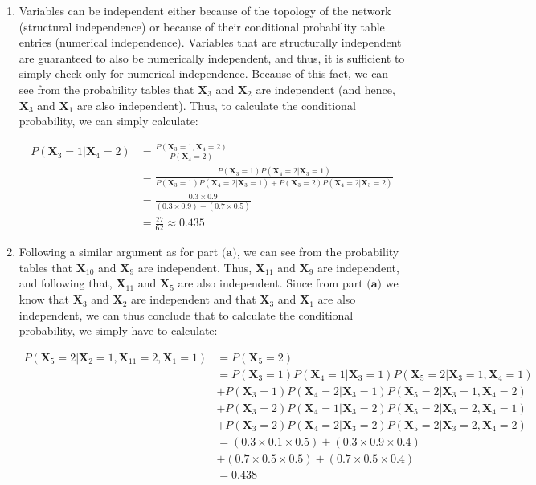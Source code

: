 \documentclass[11pt,fancychapters]{article}
\begin{document}
\begin{enumerate}[label=\textbf{(\alph*)}]
	\item Variables can be independent either because of the topology of the network (structural independence) or because of their conditional probability table entries (numerical independence). Variables that are structurally independent are guaranteed to also be numerically independent, and thus, it is sufficient to simply check only for numerical independence. Because of this fact, we can see from the probability tables that $\mathbf{X}_3$ and $\mathbf{X}_2$ are independent (and hence, $\mathbf{X}_3$ and $\mathbf{X}_1$ are also independent). Thus, to calculate the conditional probability, we can simply calculate:
	
	\begin{align*}
		P(\mathbf{X}_3 = 1 | \mathbf{X}_4 = 2) &= \frac{P(\mathbf{X}_3 = 1, \mathbf{X}_4 = 2)}{P(\mathbf{X}_4 = 2)} \\
		&= \frac{P(\mathbf{X}_3 = 1)P(\mathbf{X}_4 = 2 | \mathbf{X}_3 = 1)}{P(\mathbf{X}_3 = 1)P(\mathbf{X}_4 = 2 | \mathbf{X}_3 = 1) + P(\mathbf{X}_3 = 2)P(\mathbf{X}_4 = 2 | \mathbf{X}_3 = 2)} \\
		&= \frac{0.3 \times 0.9}{(0.3 \times 0.9) + (0.7 \times 0.5)} \\
		&= \frac{27}{62} \approx 0.435
	\end{align*}
	
	\item Following a similar argument as for part $\textbf{(a)}$, we can see from the probability tables that $\mathbf{X}_{10}$ and $\mathbf{X}_{9}$ are independent. Thus, $\mathbf{X}_{11}$ and $\mathbf{X}_{9}$ are independent, and following that, $\mathbf{X}_{11}$ and $\mathbf{X}_{5}$ are also independent. Since from part $\textbf{(a)}$ we know that $\mathbf{X}_3$ and $\mathbf{X}_2$ are independent and that $\mathbf{X}_3$ and $\mathbf{X}_1$ are also independent, we can thus conclude that to calculate the conditional probability, we simply have to calculate:
	
	\begin{align*}
		P(\mathbf{X}_5 = 2 | \mathbf{X}_2 = 1, \mathbf{X}_{11} = 2, \mathbf{X}_1 = 1) &= P(\mathbf{X}_5 = 2) \\
		&= P(\mathbf{X}_3 = 1)P(\mathbf{X}_4 = 1 | \mathbf{X}_3 = 1)P(\mathbf{X}_5 = 2 | \mathbf{X}_3 = 1, \mathbf{X}_4 = 1) \\
		&+ P(\mathbf{X}_3 = 1)P(\mathbf{X}_4 = 2 | \mathbf{X}_3 = 1)P(\mathbf{X}_5 = 2 | \mathbf{X}_3 = 1, \mathbf{X}_4 = 2) \\
		&+ P(\mathbf{X}_3 = 2)P(\mathbf{X}_4 = 1 | \mathbf{X}_3 = 2)P(\mathbf{X}_5 = 2 | \mathbf{X}_3 = 2, \mathbf{X}_4 = 1) \\
		&+ P(\mathbf{X}_3 = 2)P(\mathbf{X}_4 = 2 | \mathbf{X}_3 = 2)P(\mathbf{X}_5 = 2 | \mathbf{X}_3 = 2, \mathbf{X}_4 = 2) \\
		&= (0.3 \times 0.1 \times 0.5) + (0.3 \times 0.9 \times 0.4) \\
		&+ (0.7 \times 0.5 \times 0.5) + (0.7 \times 0.5 \times 0.4) \\
		&= 0.438
	\end{align*}
\end{enumerate}
\end{document}
